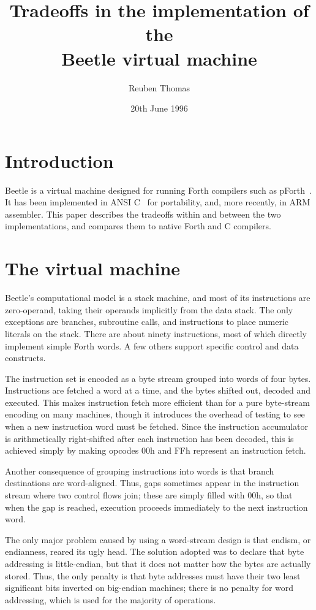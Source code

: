 \documentclass{article}
\title{Tradeoffs in the implementation of the\\Beetle virtual machine}
\author{Reuben Thomas}
\date{20th June 1996}
\begin{document}
\maketitle


\section{Introduction}

Beetle is a virtual machine designed for running Forth compilers such as
pForth~\cite{beetledis}. It has been implemented in ANSI C~\cite{beetledis} for
portability, and, more recently, in ARM assembler. This paper describes the
tradeoffs within and between the two implementations, and compares them to
native Forth and C compilers.


\section{The virtual machine}

Beetle's computational model is a stack machine, and most of its instructions
are zero-operand, taking their operands implicitly from the data stack. The
only exceptions are branches, subroutine calls, and instructions to place
numeric literals on the stack. There are about ninety instructions, most of
which directly implement simple Forth words. A few others support specific
control and data constructs.

The instruction set is encoded as a byte stream grouped into words of four
bytes. Instructions are fetched a word at a time, and the bytes shifted out,
decoded and executed. This makes instruction fetch more efficient than for a
pure byte-stream encoding on many machines, though it introduces the overhead
of testing to see when a new instruction word must be fetched. Since the
instruction accumulator is arithmetically right-shifted after each
instruction has been decoded, this is achieved simply by making opcodes 00h
and FFh represent an instruction fetch.

Another consequence of grouping instructions into words is that branch
destinations are word-aligned. Thus, gaps sometimes appear in the
instruction stream where two control flows join; these are simply filled with
00h, so that when the gap is reached, execution proceeds immediately to the
next instruction word.

The only major problem caused by using a word-stream design is that endism,
or endianness, reared its ugly head. The solution adopted was to declare that
byte addressing is little-endian, but that it does not matter how the bytes
are actually stored. Thus, the only penalty is that byte addresses must have
their two least significant bits inverted on big-endian machines; there is no
penalty for word addressing, which is used for the majority of operations.
\end{document}
